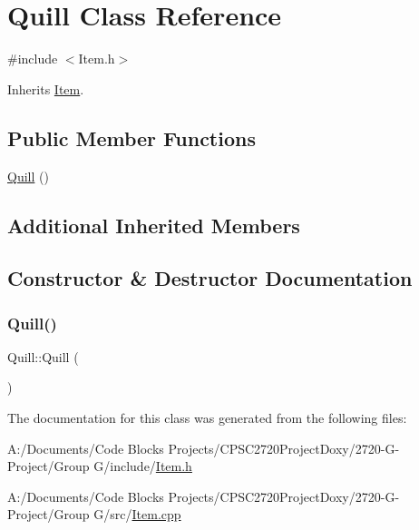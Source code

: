 \hypertarget{class_quill}{}\section{Quill Class Reference}
\label{class_quill}


{\ttfamily \#include $<$Item.\+h$>$}



Inherits \mbox{\hyperlink{class_item}{Item}}.

\subsection*{Public Member Functions}
\begin{DoxyCompactItemize}
\item 
\mbox{\hyperlink{class_quill_aeddbf7411887c5ce916bac3221245e0b}{Quill}} ()
\end{DoxyCompactItemize}
\subsection*{Additional Inherited Members}


\subsection{Constructor \& Destructor Documentation}
\mbox{\label{class_quill_aeddbf7411887c5ce916bac3221245e0b}} 
\subsubsection{\texorpdfstring{Quill()}{Quill()}}
{\footnotesize\ttfamily Quill\+::\+Quill (\begin{DoxyParamCaption}{ }\end{DoxyParamCaption})}



The documentation for this class was generated from the following files\+:\begin{DoxyCompactItemize}
\item 
A\+:/\+Documents/\+Code Blocks Projects/\+C\+P\+S\+C2720\+Project\+Doxy/2720-\/\+G-\/\+Project/\+Group G/include/\mbox{\hyperlink{_item_8h}{Item.\+h}}\item 
A\+:/\+Documents/\+Code Blocks Projects/\+C\+P\+S\+C2720\+Project\+Doxy/2720-\/\+G-\/\+Project/\+Group G/src/\mbox{\hyperlink{_item_8cpp}{Item.\+cpp}}\end{DoxyCompactItemize}
